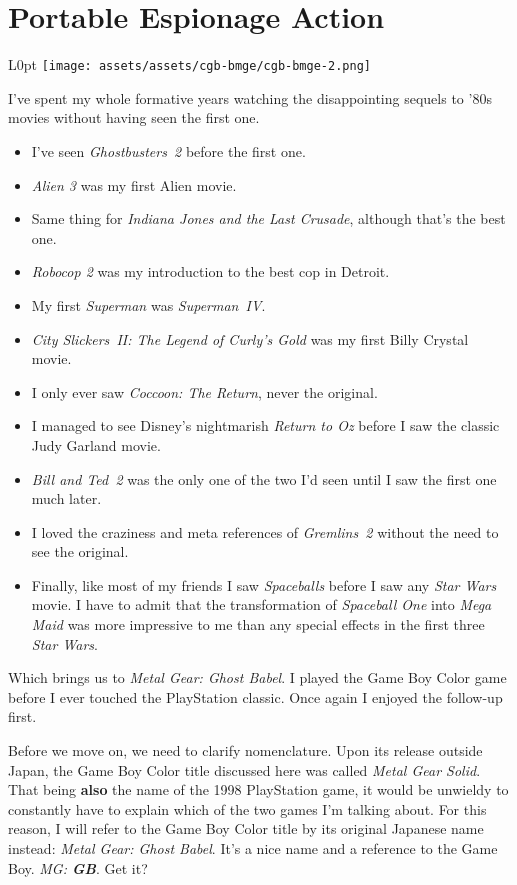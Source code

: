 \documentclass{book}
\begin{document}
\newpage\FloatBarrier\needspace{10mm}\section*{Portable Espionage Action}\nopagebreak[4]
\begin{wrapfigure}{L}{0pt} \texttt{[image: assets/assets/cgb-bmge/cgb-bmge-2.png]}\end{wrapfigure}
I’ve spent my whole formative years watching the disappointing sequels to ’80s movies without having seen the first one.
\begin{itemize} [nosep]
\item I’ve seen \emph{Ghostbusters 2} before the first one.
\item \emph{Alien 3} was my first Alien movie.
\item Same thing for \emph{Indiana Jones and the Last Crusade}, although that’s the best one.
\item \emph{Robocop 2} was my introduction to the best cop in Detroit.
\item My first \emph{Superman} was \emph{Superman IV}.
\item \emph{City Slickers II: The Legend of Curly’s Gold} was my first Billy Crystal movie.
\item I only ever saw \emph{Coccoon: The Return}, never the original.
\item I managed to see Disney’s nightmarish \emph{Return to Oz} before I saw the classic Judy Garland movie.
\item \emph{Bill and Ted 2} was the only one of the two I’d seen until I saw the first one much later.
\item I loved the craziness and meta references of \emph{Gremlins 2} without the need to see the original.
\item Finally, like most of my friends I saw \emph{Spaceballs} before I saw any \emph{Star Wars} movie. I have to admit that the transformation of \emph{Spaceball One} into \emph{Mega Maid} was more impressive to me than any special effects in the first three \emph{Star Wars}.
\end{itemize}\noindent

Which brings us to \emph{Metal Gear: Ghost Babel}. I played the Game Boy Color game before I ever touched the PlayStation classic. Once again I enjoyed the follow-up first.

Before we move on, we need to clarify nomenclature. Upon its release outside Japan, the Game Boy Color title discussed here was called \emph{Metal Gear Solid}. That being \textbf{also} the name of the 1998 PlayStation game, it would be unwieldy to constantly have to explain which of the two games I’m talking about. For this reason, I will refer to the Game Boy Color title by its original Japanese name instead: \emph{Metal Gear: Ghost Babel}. It’s a nice name and a reference to the Game Boy. \emph{MG: \textbf{GB}}. Get it?
\end{document}

